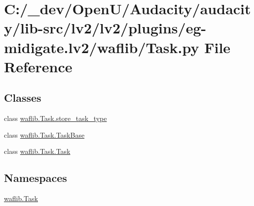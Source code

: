 \hypertarget{lv2_2plugins_2eg-midigate_8lv2_2waflib_2_task_8py}{}\section{C\+:/\+\_\+dev/\+Open\+U/\+Audacity/audacity/lib-\/src/lv2/lv2/plugins/eg-\/midigate.lv2/waflib/\+Task.py File Reference}
\label{lv2_2plugins_2eg-midigate_8lv2_2waflib_2_task_8py}
\subsection*{Classes}
\begin{DoxyCompactItemize}
\item 
class \hyperlink{classwaflib_1_1_task_1_1store__task__type}{waflib.\+Task.\+store\+\_\+task\+\_\+type}
\item 
class \hyperlink{classwaflib_1_1_task_1_1_task_base}{waflib.\+Task.\+Task\+Base}
\item 
class \hyperlink{classwaflib_1_1_task_1_1_task}{waflib.\+Task.\+Task}
\end{DoxyCompactItemize}
\subsection*{Namespaces}
\begin{DoxyCompactItemize}
\item 
 \hyperlink{namespacewaflib_1_1_task}{waflib.\+Task}
\end{DoxyCompactItemize}
